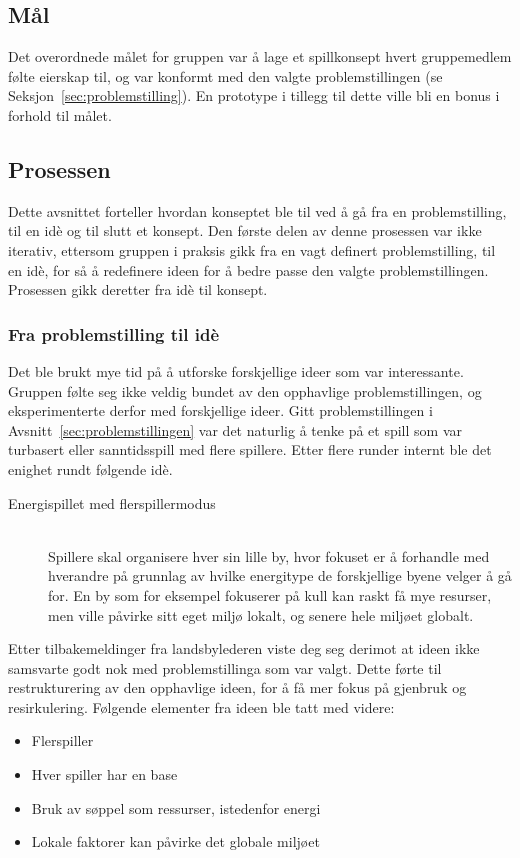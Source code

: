 \subsection{Mål}
Det overordnede målet for gruppen var å lage et spillkonsept hvert
gruppemedlem følte eierskap til, og var konformt med den valgte
problemstillingen (se Seksjon~\ref{sec:problemstilling}). En prototype i
tillegg til dette ville bli en bonus i forhold til målet.
\subsection{Prosessen}
Dette avsnittet forteller hvordan konseptet ble til ved å gå fra en
problemstilling, til en idè og til slutt et konsept. Den første delen av
denne prosessen var ikke iterativ, ettersom gruppen i praksis gikk fra
en vagt definert problemstilling, til en idè, for så å redefinere ideen
for å bedre passe den valgte problemstillingen. Prosessen gikk deretter
fra idè til konsept.
\subsubsection{Fra problemstilling til idè}
Det ble brukt mye tid på å utforske forskjellige ideer som var
interessante. Gruppen følte seg ikke veldig bundet av den opphavlige
problemstillingen, og eksperimenterte derfor med forskjellige ideer.
Gitt problemstillingen i Avsnitt~\ref{sec:problemstillingen} var det
naturlig å tenke på et spill som var turbasert eller sanntidsspill med
flere spillere. Etter flere runder internt ble det enighet rundt
følgende idè.
\begin{description}
\item[Energispillet med flerspillermodus] \hfill\\
Spillere skal organisere hver sin lille by, hvor fokuset er å forhandle
med hverandre på grunnlag av hvilke energitype de forskjellige byene
velger å gå for. En by som for eksempel fokuserer på kull kan raskt få
mye resurser, men ville påvirke sitt eget miljø lokalt, og senere hele
miljøet globalt.
\end{description}
Etter tilbakemeldinger fra landsbylederen viste deg seg derimot at ideen
ikke samsvarte godt nok med problemstillinga som var valgt. Dette førte
til restrukturering av den opphavlige ideen, for å få mer fokus på
gjenbruk og resirkulering. Følgende elementer fra ideen ble tatt med
videre:
\begin{itemize}
	\item Flerspiller
	\item Hver spiller har en base
	\item Bruk av søppel som ressurser, istedenfor energi
	\item Lokale faktorer kan påvirke det globale miljøet
\end{itemize}
